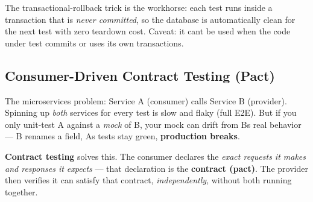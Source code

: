 \documentclass[11pt]{article}
\begin{document}
The transactional-rollback trick is the workhorse: each test runs inside a transaction that is \emph{never committed}, so the database is automatically clean for the next test with zero teardown cost. Caveat: it can\textquotesingle t be used when the code under test commits or uses its own transactions.

\subsection{Consumer-Driven Contract Testing (Pact)}\label{consumer-driven-contract-testing-pact}

The microservices problem: Service A (consumer) calls Service B (provider). Spinning up \emph{both} services for every test is slow and flaky (full E2E). But if you only unit-test A against a \emph{mock} of B, your mock can drift from B\textquotesingle s real behavior --- B renames a field, A\textquotesingle s tests stay green, \textbf{production breaks}.

\textbf{Contract testing} solves this. The consumer declares the \emph{exact requests it makes and responses it expects} --- that declaration is the \textbf{contract (pact)}. The provider then verifies it can satisfy that contract, \emph{independently}, without both running together.

\end{document}
